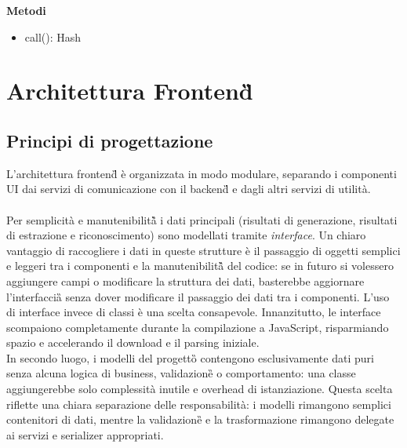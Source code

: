 \documentclass[a4paper,11pt]{article}
\begin{document}
\textbf{Metodi} 
\begin{itemize}
    \item call(): Hash
\end{itemize}


\section{Architettura Frontend\G{}}
\label{sec:design_architetturale_frontend}
\subsection{Principi di progettazione}
L'architettura frontend\G{} è organizzata in modo modulare, separando i componenti UI dai servizi di comunicazione con il backend\G{} e dagli altri servizi di utilità. \\\\
Per semplicità e manutenibilità\G{} i dati principali (risultati di generazione, risultati di estrazione e riconoscimento) sono modellati tramite \textit{interface}. Un chiaro vantaggio di raccogliere i dati in queste strutture è il passaggio di oggetti semplici e leggeri tra i componenti e la manutenibilità\G{} del codice: se in futuro si volessero aggiungere campi o modificare la struttura dei dati, basterebbe aggiornare l'interfaccia\G{} senza dover modificare il passaggio dei dati tra i componenti.
L'uso di interface invece di classi è una scelta consapevole. Innanzitutto, le interface scompaiono completamente durante la compilazione a JavaScript, risparmiando spazio e accelerando il download e il parsing iniziale. \\
In secondo luogo, i modelli del progetto\G{} contengono esclusivamente dati puri senza alcuna logica di business, validazione\G{} o comportamento: una classe aggiungerebbe solo complessità inutile e overhead di istanziazione. Questa scelta riflette una chiara separazione delle responsabilità: i modelli rimangono semplici contenitori di dati, mentre la validazione\G{} e la trasformazione rimangono delegate ai servizi e serializer appropriati.
\end{document}
